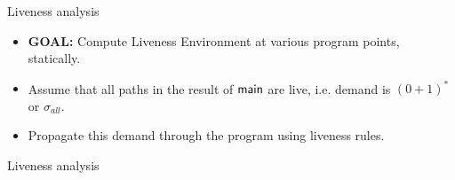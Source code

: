 \documentclass[xcolor=x11names,compress,mathserif]{beamer}
\renewcommand{\(}{\begin{columns}}
\renewcommand{\)}{\end{columns}}
\newcommand{\<}[1]{\begin{column}{#1}}
\renewcommand{\>}{\end{column}}
\begin{document}

\begin{frame}{Liveness analysis}
  \begin{itemize}
  \item {\bf  GOAL:} Compute  Liveness Environment at  various program
    points, statically. 
  \item Assume that all paths in the result of ${\sf main}$ are live, i.e. demand is $(0 + 1)^*$ or $\sigma_{all}$.
  \item Propagate this demand through the program using liveness rules.
  \end{itemize}
\end{frame}
\begin{frame}{Liveness analysis}
  
\end{frame}














\end{document}
